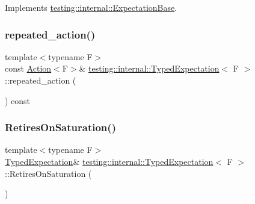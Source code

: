 Implements \hyperlink{classtesting_1_1internal_1_1_expectation_base_a5ce4f648c7b112d27b798711d1e3ff5b}{testing\+::internal\+::\+Expectation\+Base}.

\mbox{\label{classtesting_1_1internal_1_1_typed_expectation_a2b32621ac4d71c1a71893eb0499f723d}} 
\subsubsection{\texorpdfstring{repeated\+\_\+action()}{repeated\_action()}}
{\footnotesize\ttfamily template$<$typename F$>$ \\
const \hyperlink{classtesting_1_1_action}{Action}$<$F$>$\& \hyperlink{classtesting_1_1internal_1_1_typed_expectation}{testing\+::internal\+::\+Typed\+Expectation}$<$ F $>$\+::repeated\+\_\+action (\begin{DoxyParamCaption}{ }\end{DoxyParamCaption}) const\hspace{0.3cm}{\ttfamily [inline]}}

\mbox{\label{classtesting_1_1internal_1_1_typed_expectation_ae7c42958a5d2c336ba7a42a871bf7709}} 
\subsubsection{\texorpdfstring{Retires\+On\+Saturation()}{RetiresOnSaturation()}}
{\footnotesize\ttfamily template$<$typename F$>$ \\
\hyperlink{classtesting_1_1internal_1_1_typed_expectation}{Typed\+Expectation}\& \hyperlink{classtesting_1_1internal_1_1_typed_expectation}{testing\+::internal\+::\+Typed\+Expectation}$<$ F $>$\+::Retires\+On\+Saturation (\begin{DoxyParamCaption}{ }\end{DoxyParamCaption})\hspace{0.3cm}{\ttfamily [inline]}}

